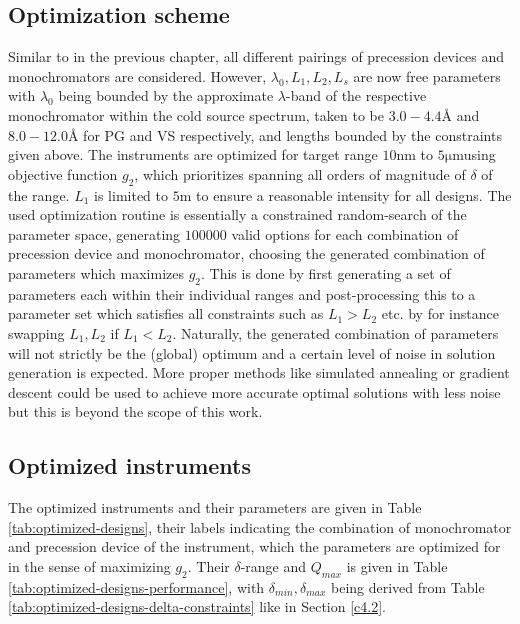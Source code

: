 \documentclass{article}
\newcommand{\targetrange}{$10 \unit{\nano\meter}$ to $5 \unit{\micro\meter}$}
\begin{document}
\subsection{Optimization scheme}
\label{c5.3}
Similar to in the previous chapter, all different pairings of precession devices and monochromators are considered. However, $\lambda_0, L_1, L_2, L_s$ are now free parameters with $\lambda_0$ being bounded by the approximate $\lambda$-band of the respective monochromator within the cold source spectrum, taken to be $3.0 - 4.4$Å and $8.0 - 12.0$Å for PG and VS respectively, and lengths bounded by the constraints given above. 
The instruments are optimized for target range \targetrange using objective function $g_2$, which prioritizes spanning all orders of magnitude of $\delta$ of the range. $L_1$ is limited to $5 \unit\meter$ to ensure a reasonable intensity for all designs. 
The used optimization routine is essentially a constrained random-search of the parameter space, generating $100000$ valid options for each combination of precession device and monochromator, choosing the generated combination of parameters which maximizes $g_2$. This is done by first generating a set of parameters each within their individual ranges and post-processing this to a parameter set which satisfies all constraints such as $L_1>L_2$ etc. by for instance swapping $L_1, L_2$ if $L_1 < L_2$. Naturally, the generated combination of parameters will not strictly be the (global) optimum and a certain level of noise in solution generation is expected. More proper methods like simulated annealing or gradient descent could be used to achieve more accurate optimal solutions with less noise but this is beyond the scope of this work.



\subsection{Optimized instruments}
The optimized instruments and their parameters are given in Table \ref{tab:optimized-designs}, their labels indicating the combination of monochromator and precession device of the instrument, which the parameters are optimized for in the sense of maximizing $g_2$. Their $\delta$-range and $Q_{max}$ is given in Table \ref{tab:optimized-designs-performance}, with $\delta_{min}, \delta_{max}$ being derived from Table \ref{tab:optimized-designs-delta-constraints} like in Section \ref{c4.2}.
\end{document}
